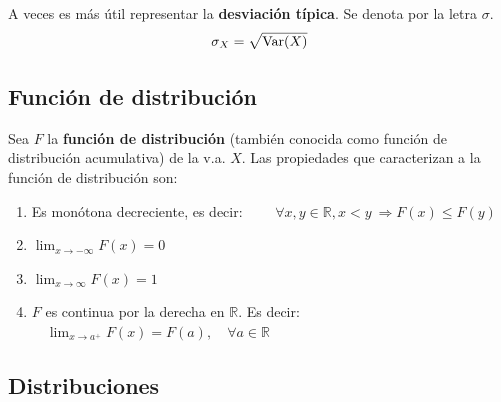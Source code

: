 \documentclass[a4paper]{book}
\begin{document}
A veces es más útil representar la \textbf{desviación típica}. Se denota por la letra $\sigma$.
\[\sigma _X = \sqrt{\operatorname{Var}(X)}\]

\subsection{Función de distribución}

Sea $F$ la \textbf{función de distribución} (también conocida como función de distribución acumulativa) de la v.a. $X$. Las propiedades que caracterizan a la función de distribución son:

\begin{enumerate}
	\item Es monótona decreciente, es decir: $\displaystyle{\qquad \forall x , y\in \mathbb{R}, x<y \ \Rightarrow F(x) \leq F(y)}$
	\item $\displaystyle{\lim_{x \to -\infty} F(x)=0}$
	\item $\displaystyle{\lim_{x \to \infty} F(x)=1}$
	\item $F$ es continua por la derecha en $ \mathbb{R} $. Es decir: $\displaystyle{\quad \lim_{x \to a^+} F(x)=F(a), \quad \forall a \in \mathbb{R}}$
\end{enumerate}

%
%

\subsection{Distribuciones}
\end{document}
